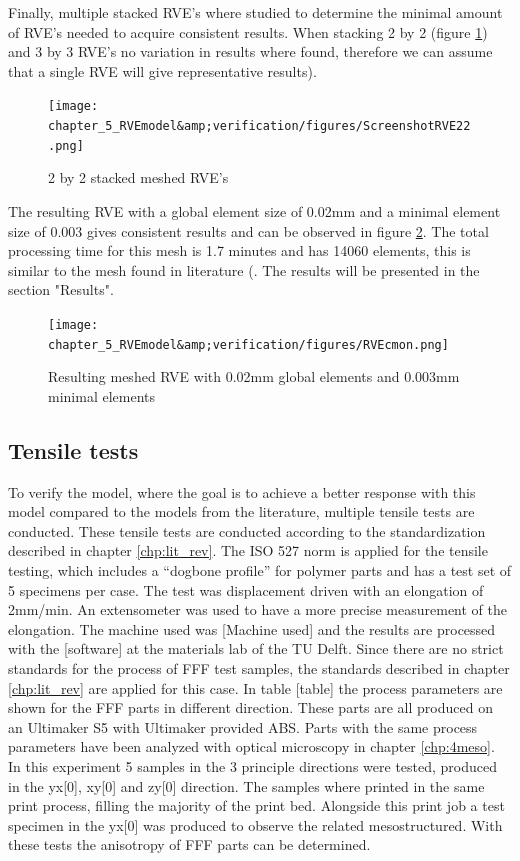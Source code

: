 Finally, multiple stacked RVE's where studied to determine the minimal amount of RVE's needed to acquire consistent results. When stacking 2 by 2 (figure \ref{fig:RVE22}) and 3 by 3 RVE's no variation in results where found, therefore we can assume that a single RVE will give representative results).

\begin{figure}[H]
    \centering
    \texttt{[image: chapter\_5\_RVEmodel\&amp;verification/figures/ScreenshotRVE22.png]}
    \caption{2 by 2 stacked meshed RVE's}
    \label{fig:RVE22}
\end{figure}

The resulting RVE with a global element size of 0.02mm and a minimal element size of 0.003 gives consistent results and can be observed in figure \ref{fig:RVEfinal}. The total processing time for this mesh is 1.7 minutes and has 14060 elements, this is similar to the mesh found in literature (. The results will be presented in the section "Results". 

\begin{figure}[H]
    \centering
    \texttt{[image: chapter\_5\_RVEmodel\&amp;verification/figures/RVEcmon.png]}
    \caption{Resulting meshed RVE with 0.02mm global elements and 0.003mm minimal elements}
    \label{fig:RVEfinal}
\end{figure}

\subsection{Tensile tests}
To verify the model, where the goal is to achieve a better response with this model compared to the models from the literature, multiple tensile tests are conducted. These tensile tests are conducted according to the standardization described in chapter \ref{chp:lit_rev}. The ISO 527 norm is applied for the tensile testing, which includes a “dogbone profile” for polymer parts and has a test set of 5 specimens per case. The test was displacement driven with an elongation of 2mm/min. An extensometer was used to have a more precise measurement of the elongation. The machine used was [Machine used] and the results are processed with the [software] at the materials lab of the TU Delft. 
Since there are no strict standards for the process of FFF test samples, the standards described in chapter \ref{chp:lit_rev} are applied for this case. In table [table] the process parameters are shown for the FFF parts in different direction.  These parts are all produced on an Ultimaker S5 with Ultimaker provided ABS. Parts with the same process parameters have been analyzed with optical microscopy in chapter \ref{chp:4meso}. 
In this experiment 5 samples in the 3 principle directions were tested, produced in the yx[0], xy[0] and zy[0] direction. The samples where printed in the same print process, filling the majority of the print bed. Alongside this print job a test specimen in the yx[0] was produced to observe the related mesostructured. With these tests the anisotropy of FFF parts can be determined.

